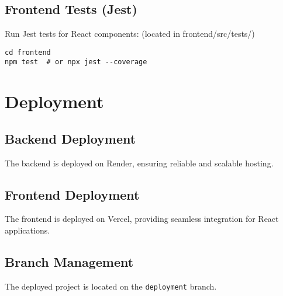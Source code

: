 \documentclass[a4paper,12pt]{article}
\begin{document}
\subsection{Frontend Tests (Jest)}
Run Jest tests for React components: (located in frontend/src/tests/)
\begin{verbatim}
cd frontend
npm test  # or npx jest --coverage
\end{verbatim}

\section{Deployment}

\subsection{Backend Deployment}
The backend is deployed on Render, ensuring reliable and scalable hosting.

\subsection{Frontend Deployment}
The frontend is deployed on Vercel, providing seamless integration for React applications.

\subsection{Branch Management}
The deployed project is located on the \texttt{deployment} branch.
\end{document}
